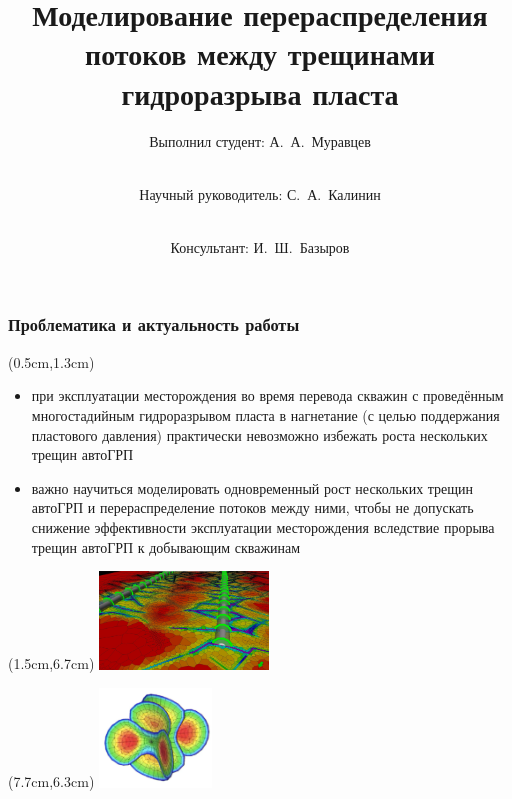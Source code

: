 \documentclass{beamer}
\title{Моделирование перераспределения потоков между трещинами гидроразрыва пласта}
\subtitle{}
\author{Выполнил студент: А.~А.~Муравцев\and \\Научный руководитель: С.~А.~Калинин\and \\Консультант: И.~Ш.~Базыров}
\begin{document}
\begin{frame}
\titlepage
\end{frame}


\begin{frame}
\frametitle{Проблематика и актуальность работы}

\begin{textblock*}{10.5cm}(0.5cm,1.3cm)
\begin{itemize}
	\item при эксплуатации месторождения во время перевода скважин с проведённым многостадийным гидроразрывом пласта в нагнетание (с целью поддержания пластового давления) практически невозможно избежать роста нескольких трещин автоГРП
	\item важно научиться моделировать одновременный рост нескольких трещин автоГРП и перераспределение потоков между ними, чтобы не допускать снижение эффективности эксплуатации месторождения вследствие прорыва трещин автоГРП к добывающим скважинам 
\end{itemize}
\end{textblock*}

\begin{textblock*}{4.5cm}(1.5cm,6.7cm)
\includegraphics[width=4.5cm]{hydraulic_fracturing_abstract_image1.jpeg}
\end{textblock*}

\begin{textblock*}{4cm}(7.7cm,6.3cm)
\includegraphics[width=3cm]{hydraulic_fracturing_abstract_image2.jpg}
\end{textblock*}

\end{frame}
\end{document}

